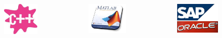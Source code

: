 \documentclass[compress=true]{beamer}
\begin{document}
\begin{frame}
\begin{itemize}
\begin{columns}
\begin{column}{0.333\textwidth}
				\end{column}
			\end{columns}
			\begin{columns}
				\begin{column}{0.3\textwidth}
					\begin{figure}
						\includegraphics[height=0.2\textheight]{cpp.png}
					\end{figure}
				\end{column}
				\begin{column}{0.3\textwidth}
					\begin{figure}
						\includegraphics[height=0.2\textheight]{matlab.png}
					\end{figure}
				\end{column}
				\begin{column}{0.4\textwidth}
					\begin{figure}
						\includegraphics[height=0.2\textheight]{oracle.png}
					\end{figure}

\end{column}
\end{columns}
\end{itemize}
\end{frame}
\end{document}
